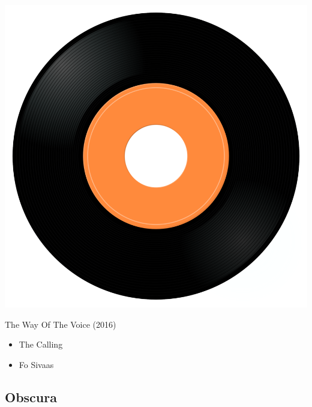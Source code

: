 \begin{minipage}[t]{0.25\textwidth}\vspace{0pt}
\captionsetup{type=figure}
\includegraphics[width=\textwidth]{Images/cover.png}
\caption*{The Way Of The Voice (2016)}
\end{minipage}
\begin{minipage}[t]{0.25\textwidth}\vspace{0pt}
\begin{itemize}[nosep,leftmargin=1em,labelwidth=*,align=left]
	\setlength{\itemsep}{0pt}
	\item The Calling
	\item Fo Sivaas
\end{itemize}
\end{minipage}

\subsection{Obscura}

